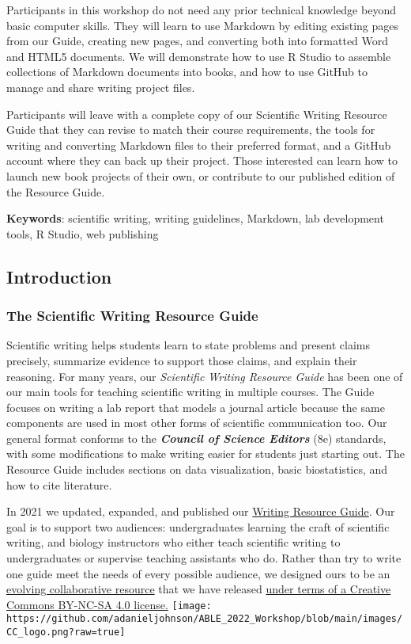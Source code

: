 \documentclass[
]{article}
\begin{document}
Participants in this workshop do not need any prior technical knowledge
beyond basic computer skills. They will learn to use Markdown by editing
existing pages from our Guide, creating new pages, and converting both
into formatted Word and HTML5 documents. We will demonstrate how to use
R Studio to assemble collections of Markdown documents into books, and
how to use GitHub to manage and share writing project files.

Participants will leave with a complete copy of our Scientific Writing
Resource Guide that they can revise to match their course requirements,
the tools for writing and converting Markdown files to their preferred
format, and a GitHub account where they can back up their project. Those
interested can learn how to launch new book projects of their own, or
contribute to our published edition of the Resource Guide.

\textbf{Keywords}: scientific writing, writing guidelines, Markdown, lab
development tools, R Studio, web publishing

\hypertarget{introduction}{%
\subsection{Introduction}\label{introduction}}

\hypertarget{the-scientific-writing-resource-guide}{%
\subsubsection{The Scientific Writing Resource
Guide}\label{the-scientific-writing-resource-guide}}

Scientific writing helps students learn to state problems and present
claims precisely, summarize evidence to support those claims, and
explain their reasoning. For many years, our \emph{Scientific Writing
Resource Guide} has been one of our main tools for teaching scientific
writing in multiple courses. The Guide focuses on writing a lab report
that models a journal article because the same components are used in
most other forms of scientific communication too. Our general format
conforms to the \textbf{\emph{Council of Science Editors}} (8e)
standards, with some modifications to make writing easier for students
just starting out. The Resource Guide includes sections on data
visualization, basic biostatistics, and how to cite literature.

In 2021 we updated, expanded, and published our
\href{https://adanieljohnson.github.io/SWP_student_writing_guide/}{Writing
Resource Guide}. Our goal is to support two audiences: undergraduates
learning the craft of scientific writing, and biology instructors who
either teach scientific writing to undergraduates or supervise teaching
assistants who do. Rather than try to write one guide meet the needs of
every possible audience, we designed ours to be an
\href{https://github.com/adanieljohnson/SWP_student_writing_guide}{evolving
collaborative resource} that we have released
\href{http://creativecommons.org/licenses/by-nc-sa/4.0/}{under terms of
a Creative Commons BY-NC-SA 4.0 license.}
\texttt{[image: https://github.com/adanieljohnson/ABLE\_2022\_Workshop/blob/main/images/CC\_logo.png?raw=true]}
\end{document}
